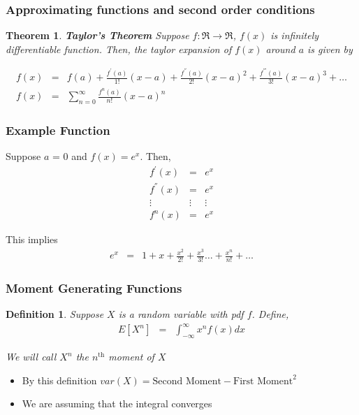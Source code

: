\documentclass{beamer}
\newtheorem{thm}{Theorem}
\newtheorem{defn}{Definition}
\numberwithin{equation}{section}
\begin{document}
\begin{frame}
\frametitle{Approximating functions and second order conditions}


\begin{thm}
\textbf{Taylor's Theorem}
Suppose $f:\Re \rightarrow \Re$, $f(x)$ is infinitely differentiable function.  Then, the taylor expansion of $f(x)$ around \alert{$a$} is given by 

\begin{eqnarray}
f(x) & = & f(a) + \frac{f^{'}(a)}{1!} (x- a) + \frac{f^{''}(a)}{2!} (x - a)^2 + \frac{f^{'''}(a)}{3!}(x- a)^3 + \hdots \nonumber \\
f(x) & = & \sum_{n=0}^{\infty } \frac{f^{n} (a) }{n!} (x - a)^n \nonumber
\end{eqnarray}

\end{thm}




\end{frame}


\begin{frame}
\frametitle{Example Function}

Suppose $a$ = 0 and $f(x) = e^{x}$.  Then, 
\begin{eqnarray}
f^{'}(x) & = & e^{x} \nonumber \\
f^{''}(x) & = & e^{x} \nonumber \\
\vdots  & \vdots & \vdots \nonumber \\
f^{n} (x) & = & e^{x} \nonumber 
\end{eqnarray}

This implies
\begin{eqnarray}
e^{x} & = & 1 + x + \frac{x^{2}}{2!} + \frac{x^3}{3!} \hdots + \frac{x^{n}}{n!} + \hdots \nonumber \end{eqnarray}

\end{frame}





\begin{frame}
\frametitle{Moment Generating Functions}


\begin{defn}
Suppose $X$ is a random variable with pdf $f$.  Define, 
\begin{eqnarray}
E[X^{n}] & = & \int_{-\infty}^{\infty} x^{n} f(x) dx   \nonumber 
\end{eqnarray}

We will call $X^{n}$ the \alert{$n^{\text{th}}$} moment of $X$ 

\end{defn}

\begin{itemize}
\item[-] By this definition $var(X) = \text{Second Moment} - \text{First Moment}^{2} $
\item[-] We are assuming that the integral converges
\end{itemize}

\end{frame}
\end{document}
